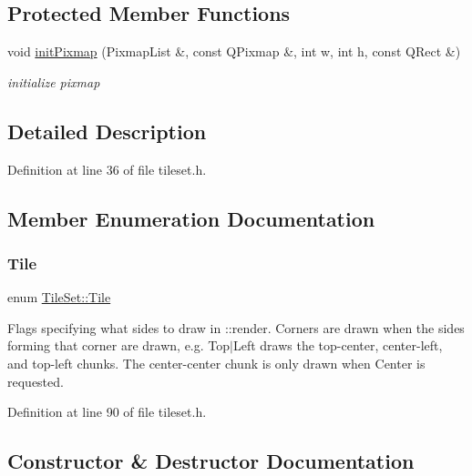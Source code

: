 \subsection*{Protected Member Functions}
\begin{DoxyCompactItemize}
\item 
\mbox{\label{class_tile_set_ac91236cb540398776d8bfa79b2ca00b1}} 
void \hyperlink{class_tile_set_ac91236cb540398776d8bfa79b2ca00b1}{init\+Pixmap} (Pixmap\+List \&, const Q\+Pixmap \&, int w, int h, const Q\+Rect \&)
\begin{DoxyCompactList}\small\item\em initialize pixmap \end{DoxyCompactList}\end{DoxyCompactItemize}


\subsection{Detailed Description}


Definition at line 36 of file tileset.\+h.



\subsection{Member Enumeration Documentation}
\mbox{\label{class_tile_set_a6055c65e4828f7fcb768403b3ad91ab6}} 
\subsubsection{\texorpdfstring{Tile}{Tile}}
{\footnotesize\ttfamily enum \hyperlink{class_tile_set_a6055c65e4828f7fcb768403b3ad91ab6}{Tile\+Set\+::\+Tile}}

Flags specifying what sides to draw in \+::render. Corners are drawn when the sides forming that corner are drawn, e.\+g. Top$\vert$\+Left draws the top-\/center, center-\/left, and top-\/left chunks. The center-\/center chunk is only drawn when Center is requested. 

Definition at line 90 of file tileset.\+h.



\subsection{Constructor \& Destructor Documentation}
\mbox{\label{class_tile_set_a9f3492dc1a9648c6a3077003508dad7c}} 
